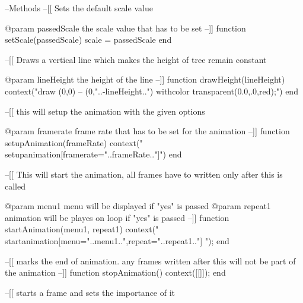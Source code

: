 --Methods
--[[
Sets the default scale value

@param passedScale the scale value that has to be set
--]]
function setScale(passedScale)
	scale = passedScale
end

--[[
Draws a vertical line which makes the height of tree remain constant

@param lineHeight the height of the line
--]]
function drawHeight(lineHeight)
	context("draw (0,0) -- (0,"..-lineHeight..") withcolor transparent(0.0,.0,red);")
end

--[[
this will setup the animation with the given options

@param framerate frame rate that has to be set for the animation
--]]
function setupAnimation(frameRate)
	context("\\setupanimation[framerate="..frameRate.."]")
end

--[[
This will start the animation, all frames have to written only after this is called

@param menu1 menu will be displayed if "yes" is passed
@param repeat1 animation will be playes on loop if "yes" is passed
--]]
function startAnimation(menu1, repeat1)
	context("\\startanimation[menu="..menu1..",repeat="..repeat1.."] ");
end

--[[
marks the end of animation. any frames written after this will not be part of the animation
--]]
function stopAnimation()
	context([[\stopanimation]]);
end

--[[
starts a frame and sets the importance of it

